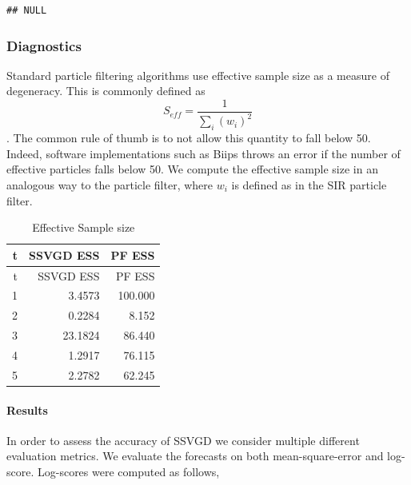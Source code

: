 \documentclass[]{article}
\newenvironment{Shaded}{\begin{snugshade}}{\end{snugshade}}
\newcommand{\KeywordTok}[1]{\textcolor[rgb]{0.13,0.29,0.53}{\textbf{{#1}}}}
\newcommand{\DataTypeTok}[1]{\textcolor[rgb]{0.13,0.29,0.53}{{#1}}}
\newcommand{\DecValTok}[1]{\textcolor[rgb]{0.00,0.00,0.81}{{#1}}}
\newcommand{\StringTok}[1]{\textcolor[rgb]{0.31,0.60,0.02}{{#1}}}
\newcommand{\NormalTok}[1]{{#1}}
\let\oldparagraph\paragraph
\renewcommand{\paragraph}[1]{\oldparagraph{#1}\mbox{}}
\begin{document}
\begin{verbatim}
## NULL
\end{verbatim}

\subsubsection{Diagnostics}\label{diagnostics}

Standard particle filtering algorithms use effective sample size as a
measure of degeneracy. This is commonly defined as
\[S_{eff} = \frac{1}{\sum_i (w_i)^2}\]. The common rule of thumb is to
not allow this quantity to fall below 50. Indeed, software
implementations such as Biips throws an error if the number of effective
particles falls below 50. We compute the effective sample size in an
analogous way to the particle filter, where \(w_i\) is defined as in the
SIR particle filter.

\begin{Shaded}
\end{Shaded}

\begin{longtable}[]{@{}rrr@{}}
\caption{Effective Sample size}\tabularnewline
\toprule
t & SSVGD ESS & PF ESS\tabularnewline
\midrule
\endfirsthead
\toprule
t & SSVGD ESS & PF ESS\tabularnewline
\midrule
\endhead
1 & 3.4573 & 100.000\tabularnewline
2 & 0.2284 & 8.152\tabularnewline
3 & 23.1824 & 86.440\tabularnewline
4 & 1.2917 & 76.115\tabularnewline
5 & 2.2782 & 62.245\tabularnewline
\bottomrule
\end{longtable}

\paragraph{Results}\label{results}

In order to assess the accuracy of SSVGD we consider multiple different
evaluation metrics. We evaluate the forecasts on both mean-square-error
and log-score. Log-scores were computed as follows,
\end{document}
